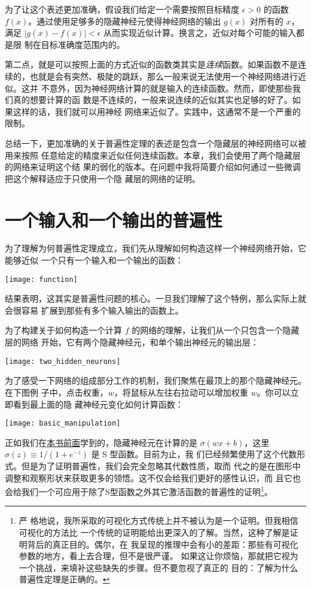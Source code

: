 为了让这个表述更加准确，假设我们给定一个需要按照目标精度 $\epsilon > 0$ 的函数
$f(x)$。通过使用足够多的隐藏神经元使得神经网络的输出 $g(x)$ 对所有的 $x$，满足
$|g(x) - f(x)| < \epsilon$ 从而实现近似计算。换言之，近似对每个可能的输入都是限
制在目标准确度范围内的。

第二点，就是可以按照上面的方式近似的函数类其实是\emph{连续}函数。如果函数不是连
续的，也就是会有突然、极陡的跳跃，那么一般来说无法使用一个神经网络进行近似。这并
不意外，因为神经网络计算的就是输入的连续函数。然而，即使那些我们真的想要计算的函
数是不连续的，一般来说连续的近似其实也足够的好了。如果这样的话，我们就可以用神经
网络来近似了。实践中，这通常不是一个严重的限制。

总结一下，更加准确的关于普遍性定理的表述是包含一个隐藏层的神经网络可以被用来按照
任意给定的精度来近似任何连续函数。本章，我们会使用了两个隐藏层的网络来证明这个结
果的弱化的版本。在问题中我将简要介绍如何通过一些微调把这个解释适应于只使用一个隐
藏层的网络的证明。

\section{一个输入和一个输出的普遍性}
\label{sec:universality_with_one_input_and_one_output}

为了理解为何普遍性定理成立，我们先从理解如何构造这样一个神经网络开始，它能够近似
一个只有一个输入和一个输出的函数：
\begin{center}
  \texttt{[image: function]}
\end{center}

结果表明，这其实是普遍性问题的核心。一旦我们理解了这个特例，那么实际上就会很容易
扩展到那些有多个输入输出的函数上。

为了构建关于如何构造一个计算 $f$ 的网络的理解，让我们从一个只包含一个隐藏层的网络
开始，它有两个隐藏神经元，和单个输出神经元的输出层：
\begin{center}
  \texttt{[image: two\_hidden\_neurons]}
\end{center}

为了感受一下网络的组成部分工作的机制，我们聚焦在最顶上的那个隐藏神经元。在下图例
子中，点击权重，$w$，将鼠标从左往右拉动可以增加权重 $w$。你可以立即看到最上面的隐
藏神经元变化如何计算函数：
\begin{center}
  \texttt{[image: basic\_manipulation]}
\end{center}

正如我们在\hyperref[sec:sigmoid_neurons]{本书前面}学到的，隐藏神经元在计算的是
$\sigma(wx + b)$，这里 $\sigma(z) \equiv 1/(1+e^{-z})$ 是 S 型函数。目前为止，我
们已经频繁使用了这个代数形式。但是为了证明普遍性，我们会完全忽略其代数性质，取而
代之的是在图形中调整和观察形状来获取更多的领悟。这不仅会给我们更好的感性认识，而
且它也会给我们一个可应用于除了S型函数之外其它激活函数的普遍性的证明\footnote{严
  格地说，我所采取的可视化方式传统上并不被认为是一个证明。但我相信可视化的方法比
  一个传统的证明能给出更深入的了解。当然，这种了解是证明背后的真正目的。偶尔，在
  我呈现的推理中会有小的差距：那些有可视化参数的地方，看上去合理，但不是很严谨。
  如果这让你烦恼，那就把它视为一个挑战，来填补这些缺失的步骤。但不要忽视了真正的
  目的：了解为什么普遍性定理是正确的。}。

